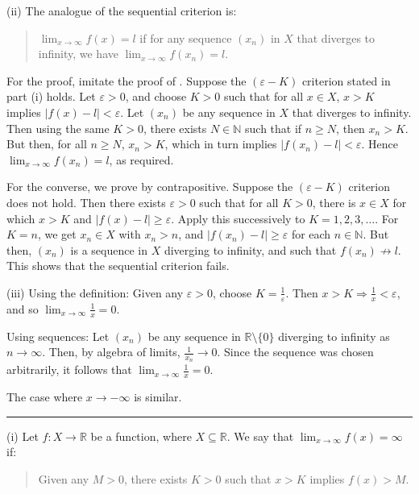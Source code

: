 \documentclass[letterpaper,10pt,english]{jupyterBook}
\begin{document}
\sphinxAtStartPar
(ii) The analogue of the sequential criterion is:
\begin{quote}

\sphinxAtStartPar
\(\lim_{x \rightarrow \infty}f(x) = l\) if for any sequence \((x_{n})\) in \(X\) that diverges to infinity, we have \(\lim_{x \rightarrow \infty}f(x_{n}) = l\).
\end{quote}

\sphinxAtStartPar
For the proof,  imitate the proof of . Suppose the \((\varepsilon- K)\) criterion stated in part (i) holds. Let \(\varepsilon>0\), and choose \(K>0\) such that for all \(x\in X\), \(x>K\) implies \(|f(x)-l|<\varepsilon\).  Let \((x_n)\) be any sequence in \(X\) that diverges to infinity. Then using the same \(K>0\), there exists \(N\in\mathbb{N}\) such that if \(n\geq N\), then \(x_{n} > K\).  But then, for all \(n\geq N\), \(x_n>K\), which in turn implies \(|f(x_{n}) - l| < \varepsilon\). Hence \(\lim_{x \rightarrow \infty}f(x_{n}) = l\), as required.

\sphinxAtStartPar
For the converse, we prove by contrapositive. Suppose the \((\varepsilon-K)\) criterion does not hold. Then there exists \(\varepsilon>0\) such that for all \(K>0\), there is \(x\in X\) for which \(x>K\) and \(|f(x)-l|\geq \varepsilon\). Apply this successively to \(K = 1, 2, 3, \ldots\). For \(K=n\), we get \(x_n\in X\) with \(x_{n} > n\), and \(|f(x_{n}) - l| \geq \varepsilon\) for each \(n\in\mathbb{N}\). But then, \((x_n)\) is a sequence in \(X\) diverging to infinity, and such that \(f(x_n)\nrightarrow l\). This shows that the sequential criterion fails.

\sphinxAtStartPar
(iii) Using the definition: Given any \(\varepsilon > 0\), choose \(K = \frac{1}{\varepsilon}\). Then \(x > K \Rightarrow \frac{1}{x} < \varepsilon\), and so \(\lim_{x\to\infty} \frac{1}{x}=0\).

\sphinxAtStartPar
Using sequences: Let \((x_n)\) be any sequence in \(\mathbb{R}\setminus\{0\}\) diverging to infinity as \(n\rightarrow\infty\). Then, by algebra of limits, \(\frac{1}{x_n}\rightarrow 0\). Since the sequence was chosen arbitrarily, it follows that \(\lim_{x\rightarrow\infty}\frac{1}{x}=0\).

\sphinxAtStartPar
The case where \(x\to-\infty\) is similar.


\bigskip\hrule\bigskip


\sphinxAtStartPar
{\hyperref[\detokenize{Problems:id12}]{}}
(i) Let \(f:X\to\mathbb{R}\) be a function, where \(X\subseteq\mathbb{R}\). We say that \(\lim_{x \rightarrow \infty} f(x) = \infty\) if:
\begin{quote}

\sphinxAtStartPar
Given any \(M > 0\), there exists \(K > 0\) such that \(x > K\) implies \(f(x) > M\).
\end{quote}
\end{document}
